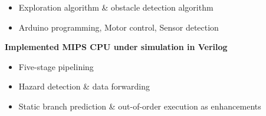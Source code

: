 \documentclass[a4paper, 12pt]{article}
\newenvironment{changemargin}[2]{%
  \begin{list}{}{%
      \setlength{\topsep}{0pt}%
      \setlength{\leftmargin}{#1}%
      \setlength{\rightmargin}{#2}%
      \setlength{\listparindent}{\parindent}%
      \setlength{\itemindent}{\parindent}%
      \setlength{\parsep}{\parskip}%
    }%
  \item[]}{\end{list}
}
\newenvironment{body}
{
\vspace*{-16pt}
\begin{changemargin}{-0.25in}{-0.5in}
}
{
\end{changemargin}
}
\begin{document}
\begin{body}
\begin{itemize}
        \item Exploration algorithm \& obstacle detection algorithm
        \item Arduino programming, Motor control, Sensor detection
    \end{itemize}
  \vspace*{-6pt}
  \textbf{Implemented MIPS CPU under simulation in Verilog}\\
  \vspace*{-6pt}
    \begin{itemize} \itemsep -0pt \small
        \item Five-stage pipelining
        \item Hazard detection \& data forwarding
        \item Static branch prediction \& out-of-order execution as enhancements
    \end{itemize}



\end{body}
\end{document}

